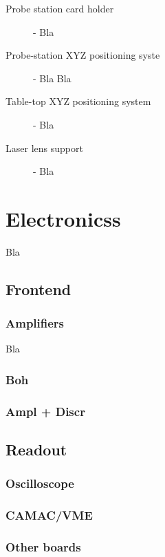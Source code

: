 \documentclass{article}
\begin{document}
 

\begin{description}
\item [Probe station card holder] - Bla

\item [Probe-station XYZ positioning syste] - Bla Bla 

\item [Table-top XYZ positioning system] - Bla

\item [Laser lens support] - Bla

\end{description}

\section {Electronicss}
Bla 

\subsection{Frontend}
\subsubsection{Amplifiers} 
Bla

\subsubsection{Boh} 

\subsubsection{Ampl + Discr}

\subsection{Readout}

\subsubsection{Oscilloscope}

\subsubsection{CAMAC/VME} 

\subsubsection{Other boards} 
\end{document}
